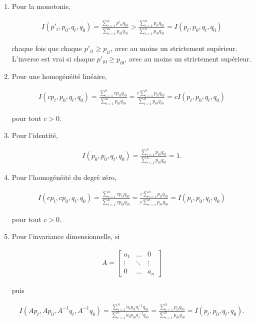 \documentclass[]{article}
\begin{document}
\begin{enumerate}
\def\labelenumi{\arabic{enumi}.}
\item
  Pour la monotonie,

  \begin{align*}
  I(p'_{t}, p_{0}, q_{t}, q_{0}) = \frac{\sum_{i = 1}^{n} p'_{it} q_{i0}} {\sum_{i = 1}^{n} p_{i0} q_{i0}}> \frac{\sum_{i = 1}^{n} p_{it} q_{i0}} {\sum_{i = 1}^{n} p_{i0} q_{i0}} = I(p_{t}, p_{0}, q_{t}, q_{0})
   \end{align*}

  chaque fois que chaque \(p'_{it} \geq p_{it}\), avec au moins un strictement supérieur. L'inverse est vrai si chaque \(p'_{i0} \geq p_{i0}\), avec au moins un strictement supérieur.
\item
  Pour une homogénéité linéaire,

  \begin{align*}
  I(cp_{t}, p_{0}, q_{t}, q_{0}) = \frac{\sum_{i = 1}^{n} cp_{it} q_{i0}} {\sum_{i = 1}^{n} p_{i0} q_{i0}} = \frac{c \sum_{i = 1}^{n} p_{it} q_{i0}} {\sum_{i = 1}^{n} p_{i0} q_{i0}} = cI(p_{t}, p_{0}, q_{t}, q_{0})
   \end{align*}

  pour tout \(c> 0\).
\item
  Pour l'identité,

  \begin{align*}
  I(p_{0}, p_{0}, q_{t}, q_{0}) = \frac{\sum_{i = 1}^{n} p_{i0} q_{i0}}{\sum_{i = 1}^{n} p_{i0} q_{i0}} = 1.
   \end{align*}
\item
  Pour l'homogénéité du degré zéro,

  \begin{align*}
  I(cp_{t}, cp_{0}, q_{t}, q_{0}) = \frac{\sum_{i = 1}^{n} cp_{it} q_{i0}} {\sum_{i = 1}^{n} cp_{i0} q_{i0}} = \frac{c \sum_{i = 1}^{n} p_{it} q_{i0}} {c \sum_{i = 1}^{n} p_{i0} q_{i0}} = I(p_{t}, p_{0}, q_{t}, q_{0})
   \end{align*}

  pour tout \(c> 0\).
\item
  Pour l'invariance dimensionnelle, si

  \begin{align*}
  A =
  \begin{bmatrix}
  a_1 & \ldots & 0 \\
  \vdots & \ddots & \vdots \\
  0 & \ldots & a_n
  \end{bmatrix}
   \end{align*}

  puis

  \begin{align*}
  I(Ap_{t}, Ap_{0}, A^{- 1} q_{t}, A^{- 1} q_{0}) = \frac{\sum_{i = 1}^{n} a_{i} p_{it} a_{i}^{- 1} q_{i0}} {\sum_{i = 1}^{n} a_{i} p_{i0} a_{i}^{- 1} q_{i0}} = \frac{\sum_{i = 1}^{n} p_{it} q_{i0}} {\sum_{i = 1}^{n} p_{i0} q_{i0}} = I(p_{t}, p_{0}, q_{t}, q_{0}).
   \end{align*}
\end{enumerate}
\end{document}
